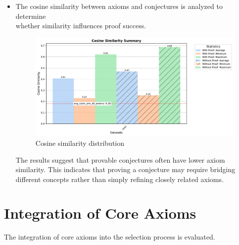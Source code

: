 \documentclass[english,version-2020-11]{uzl-thesis}
\begin{document}
\begin{itemize}
    \FloatBarrier

    \item The cosine similarity between axioms and conjectures is analyzed to determine\\ whether similarity influences proof success.
    \begin{figure}[h!]
        \centering
        \includegraphics[width=\textwidth]{cosine_similarity_mini_noAdded_summary.pdf}
        \caption{Cosine similarity distribution}
        \label{fig:cosine_similarity}
    \end{figure}
    \FloatBarrier

    The results suggest that provable conjectures often have lower axiom similarity. This indicates that proving a conjecture may require bridging different concepts rather than simply refining closely related axioms.
\end{itemize}

\clearpage

\section{Integration of Core Axioms}

The integration of core axioms into the selection process is evaluated.
\end{document}
